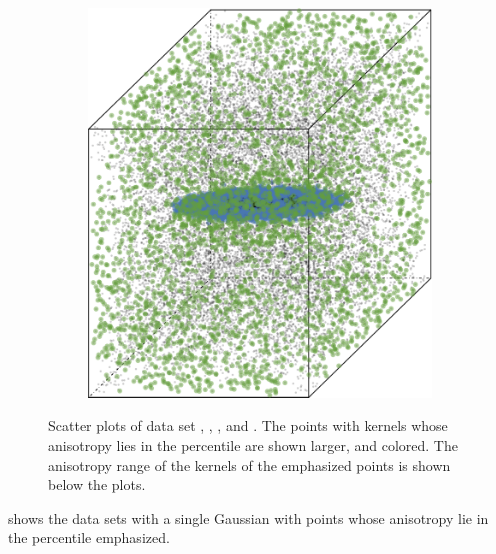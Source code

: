 \begin{figure}
\begin{subfigure}{0.23\textwidth}
					\caption{}
					\label{fig:discussion:anisotropy:baakman4}
				\end{subfigure}
				\begin{subfigure}{0.23\textwidth}
					\centering
					\includegraphics[keepaspectratio=true, width=\textwidth, height=0.23\textheight]{discussion/img/baakman_5_60000_anisotropy.png}
					\caption{}
					\label{fig:discussion:anisotropy:baakman5}
				\end{subfigure}
				\caption{Scatter plots of data set
					 \ferdosiOne, %
					 \baakmanOne, %
					 \baakmanFour, and %
					 \baakmanFive. %
					The points with kernels whose anisotropy lies in the  percentile are shown larger, and colored. The anisotropy range of the kernels of the emphasized points is shown below the plots.}
				\label{fig:discussion:anisotropy:singleSphere}
			\end{figure}
			 shows the data sets with a single Gaussian with points whose anisotropy lie in the  percentile emphasized.

